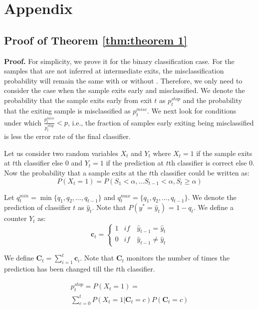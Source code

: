 \section{Appendix}
\label{sec:appendix}
\subsection{Proof of Theorem \ref{thm:theorem 1}}\label{sec: proof}
\textbf{Proof.} For simplicity, we prove it for the binary classification case. 
For the samples that are not inferred at intermediate exits, the misclassification probability will remain the same with or without \algo{}. Therefore, we only need to consider the case when the sample exits early and misclassified. We denote the probability that the sample exits early from exit $t$ as $p_t^{{stop}}$ and the probability that the exiting sample is misclassified as $p_t^{{misc}}$. We next look for conditions under which $\frac{p_t^{misc}}{p_t^{stop}}<p$, i.e., the fraction of samples early exiting being misclassified is less the error rate of the final classifier.  

Let us consider two random variables $X_t$ and $Y_t$ where $X_t=1$ if the sample exits at $t$th classifier else 0 and $Y_t = 1$ if the prediction at $t$th classifier is correct else 0. Now the probability that a sample exits at the $t$th classifier could be written as:
\begin{equation}
P(X_t = 1) = P(S_1<\alpha, \ldots S_{t-1}<\alpha, S_t\geq\alpha)    
\end{equation}

Let $q_t^{min} = \min\{q_1, q_2, \ldots, q_{t-1}\}$ and $q_t^{max} = \{q_1, q_2, \ldots, q_{t-1}\}$. We denote the prediction of classifier $t$ as $\hat{y}_t$. Note that $P(y^{*}=\hat{y}_t)$ = $1-q_t$. We define a counter $Y_t$ as:
\begin{equation}
\label{eq: Reward1}
    \mathbf{c}_t = \left\{
        \begin{array}{ll}
             1 & \textit{if} \quad \hat{y}_{t-1} = \hat{y}_t \\
             0 & \textit{if} \quad \hat{y}_{t-1} \neq \hat{y}_t
        \end{array}
    \right.
\end{equation}


We define $\mathbf{C}_t=\sum_{i=1}^{t} \mathbf{c}_i$. Note that $\mathbf{C}_t$ monitors the number of times the prediction has been changed till the $t$th classifier. 


\begin{multline}
p_t^{{stop}} = P(X_t = 1) =\\ \sum_{c=0}^{t}P(X_t = 1|\mathbf{C}_t= c)P(\mathbf{C}_t=c)
\end{multline}


